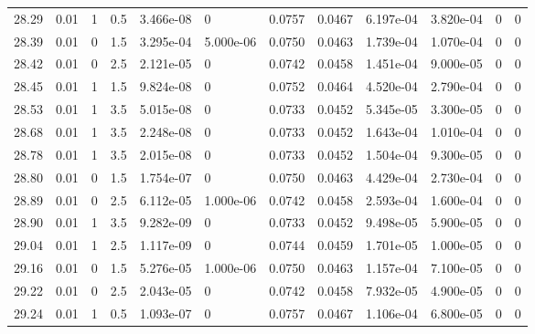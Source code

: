 \documentclass[preview]{standalone}
\begin{document}
{{{{{{{{{\begin{tabular}{L{1.2cm}C{1.2cm} C{0.3cm}C{0.5cm} C{1.4cm}C{1.4cm} C{1.4cm}C{1.4cm} C{1.6cm}C{1.6cm} C{1.6cm}C{1.6cm}}
  28.29  &  0.01  & 1     & 0.5 &  3.466e-08  & 0  &  0.0757&   0.0467& 6.197e-04 & 3.820e-04   &  0 & 0  \\ 
  28.39  &  0.01  & 0     & 1.5 &  3.295e-04  & 5.000e-06  &  0.0750&   0.0463& 1.739e-04 & 1.070e-04   &  0 & 0  \\ 
  28.42  &  0.01  & 0     & 2.5 &  2.121e-05  & 0  &  0.0742&   0.0458& 1.451e-04 & 9.000e-05   &  0 & 0  \\ 
  28.45  &  0.01  & 1     & 1.5 &  9.824e-08  & 0  &  0.0752&   0.0464& 4.520e-04 & 2.790e-04   &  0 & 0  \\ 
  28.53  &  0.01  & 1     & 3.5 &  5.015e-08  & 0  &  0.0733&   0.0452& 5.345e-05 & 3.300e-05   &  0 & 0  \\ 
  28.68  &  0.01  & 1     & 3.5 &  2.248e-08  & 0  &  0.0733&   0.0452& 1.643e-04 & 1.010e-04   &  0 & 0  \\ 
  28.78  &  0.01  & 1     & 3.5 &  2.015e-08  & 0  &  0.0733&   0.0452& 1.504e-04 & 9.300e-05   &  0 & 0  \\ 
  28.80  &  0.01  & 0     & 1.5 &  1.754e-07  & 0  &  0.0750&   0.0463& 4.429e-04 & 2.730e-04   &  0 & 0  \\ 
  28.89  &  0.01  & 0     & 2.5 &  6.112e-05  & 1.000e-06  &  0.0742&   0.0458& 2.593e-04 & 1.600e-04   &  0 & 0  \\ 
  28.90  &  0.01  & 1     & 3.5 &  9.282e-09  & 0  &  0.0733&   0.0452& 9.498e-05 & 5.900e-05   &  0 & 0  \\ 
  29.04  &  0.01  & 1     & 2.5 &  1.117e-09  & 0  &  0.0744&   0.0459& 1.701e-05 & 1.000e-05   &  0 & 0  \\ 
  29.16  &  0.01  & 0     & 1.5 &  5.276e-05  & 1.000e-06  &  0.0750&   0.0463& 1.157e-04 & 7.100e-05   &  0 & 0  \\ 
  29.22  &  0.01  & 0     & 2.5 &  2.043e-05  & 0  &  0.0742&   0.0458& 7.932e-05 & 4.900e-05   &  0 & 0  \\ 
  29.24  &  0.01  & 1     & 0.5 &  1.093e-07  & 0  &  0.0757&   0.0467& 1.106e-04 & 6.800e-05   &  0 & 0  \\ 
\hline 
\end{tabular} 

}}}}}}}}}
\end{document}
